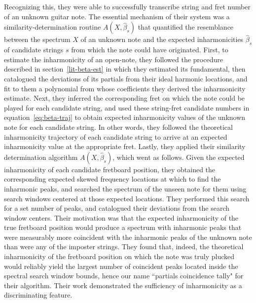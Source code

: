 \documentclass[12pt]{cmuthesis}
\begin{document}
Recognizing this, they were able to successfully transcribe string and fret number of an unknown guitar note. The essential mechanism of their system was a similarity-determination routine $A(X,\hat{\beta}_s)$ that quantified the resemblance between the spectrum $X$ of an unknown note and the expected inharmonicities $\hat\beta_s$ of candidate strings $s$ from which the note could have originated. First, to estimate the inharmonicity of an open-note, they followed the procedure described in section~\ref{lit-beta-est} in which they estimated its fundamental, then catalogued the deviations of its partials from their ideal harmonic locations, and fit to them a polynomial from whose coefficients they derived the inharmonicity estimate. Next, they inferred the corresponding fret on which the note could be played for each candidate string, and used these string-fret candidate numbers in equation~\eqref{eq:beta-traj} to obtain expected inharmonicity values of the unknown note for each candidate string. In other words, they followed the theoretical inharmonicity trajectory of each candidate string to arrive at an expected inharmonicity value at the appropriate fret. Lastly, they applied their similarity determination algorithm $A(X,\hat{\beta}_s)$, which went as follows. Given the expected inharmonicity of each candidate fretboard position, they obtained the corresponding expected skewed frequency locations at which to find the inharmonic peaks, and searched the spectrum of the unseen note for them using search windows centered at those expected locations. They performed this search for a set number of peaks, and catalogued their deviations from the search window centers. Their motivation was that the expected inharmonicity of the true fretboard position would produce a spectrum with inharmonic peaks that were measurably more coincident with the inharmonic peaks of the unknown note than were any of the imposter strings. They found that, indeed, the theoretical inharmonicity of the fretboard position on which the note was truly plucked would reliably yield the largest number of coincident peaks located inside the spectral search window bounds, hence our name ``partials coincidence tally" for their algorithm. Their work demonstrated the sufficiency of inharmonicity as a discriminating feature.
\end{document}
